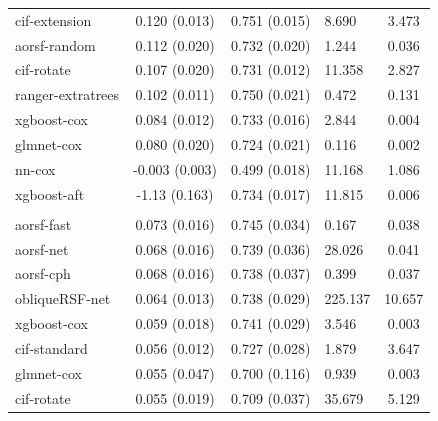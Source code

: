 \documentclass[twoside,11pt]{article}\usepackage[]{graphicx}\usepackage[]{xcolor}
\newenvironment{knitrout}{}{} %
\begin{document}
\begin{knitrout}
\begin{longtable}[t]{lcclc}
\hspace{1em}cif-extension & 0.120 (0.013) & 0.751 (0.015) & 8.690 & 3.473\\
\hspace{1em}aorsf-random & 0.112 (0.020) & 0.732 (0.020) & 1.244 & 0.036\\
\hspace{1em}cif-rotate & 0.107 (0.020) & 0.731 (0.012) & 11.358 & 2.827\\
\hspace{1em}ranger-extratrees & 0.102 (0.011) & 0.750 (0.021) & 0.472 & 0.131\\
\hspace{1em}xgboost-cox & 0.084 (0.012) & 0.733 (0.016) & 2.844 & 0.004\\
\hspace{1em}glmnet-cox & 0.080 (0.020) & 0.724 (0.021) & 0.116 & 0.002\\
\hspace{1em}nn-cox & -0.003 (0.003) & 0.499 (0.018) & 11.168 & 1.086\\
\hspace{1em}xgboost-aft & -1.13 (0.163) & 0.734 (0.017) & 11.815 & 0.006\\
\addlinespace[0.3em]
\hline
\multicolumn{5}{l}{\textit{\textbf{GUIDE-IT; CVD death, n = 894, p = 59}}}\\
\hline
\hspace{1em}aorsf-fast & 0.073 (0.016) & 0.745 (0.034) & 0.167 & 0.038\\
\hspace{1em}aorsf-net & 0.068 (0.016) & 0.739 (0.036) & 28.026 & 0.041\\
\hspace{1em}aorsf-cph & 0.068 (0.016) & 0.738 (0.037) & 0.399 & 0.037\\
\hspace{1em}obliqueRSF-net & 0.064 (0.013) & 0.738 (0.029) & 225.137 & 10.657\\
\hspace{1em}xgboost-cox & 0.059 (0.018) & 0.741 (0.029) & 3.546 & 0.003\\
\hspace{1em}cif-standard & 0.056 (0.012) & 0.727 (0.028) & 1.879 & 3.647\\
\hspace{1em}glmnet-cox & 0.055 (0.047) & 0.700 (0.116) & 0.939 & 0.003\\
\hspace{1em}cif-rotate & 0.055 (0.019) & 0.709 (0.037) & 35.679 & 5.129\\

\end{longtable}
\end{knitrout}
\end{document}
